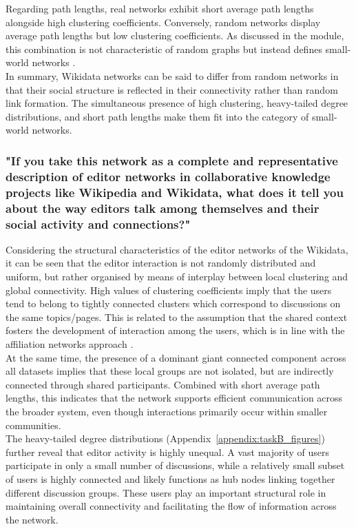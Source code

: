 \documentclass[acmsmall,nonacm,natbib=false]{acmart}
\begin{document}
Regarding path lengths, real networks exhibit short average path lengths alongside high clustering coefficients. Conversely, random networks display average path lengths but low clustering coefficients. As discussed in the module, this combination is not characteristic of random graphs but instead defines small-world networks \cite{watts1998collective,milgram1967smallworld}.\\
In summary, Wikidata networks can be said to differ from random networks in that their social structure is reflected in their connectivity rather than random link formation. The simultaneous presence of high clustering, heavy-tailed degree distributions, and short path lengths make them fit into the category of small-world networks.

\subsubsection{\large{\textbf{"If you take this network as a complete and representative description of editor networks in collaborative knowledge projects like Wikipedia and Wikidata, what does it tell you about the way editors talk among themselves and their social activity and connections?"}}}
\leavevmode \par \noindent
Considering the structural characteristics of the editor networks of the Wikidata, it can be seen that the editor interaction is not randomly distributed and uniform, but rather organised by means of interplay between local clustering and global connectivity. High values of clustering coefficients imply that the users tend to belong to tightly connected clusters which correspond to discussions on the same topics/pages. This is related to the assumption that the shared context fosters the development of interaction among the users, which is in line with the affiliation networks approach \cite{easley2010networks}.\\
At the same time, the presence of a dominant giant connected component across all datasets implies that these local groups are not isolated, but are indirectly connected through shared participants. Combined with short average path lengths, this indicates that the network supports efficient communication across the broader system, even though interactions primarily occur within smaller communities.\\
The heavy-tailed degree distributions (Appendix~\ref{appendix:taskB_figures}) further reveal that editor activity is highly unequal. A vast majority of users participate in only a small number of discussions, while a relatively small subset of users is highly connected and likely functions as hub nodes linking together different discussion groups. These users play an important structural role in maintaining overall connectivity and facilitating the flow of information across the network.\\
\end{document}
